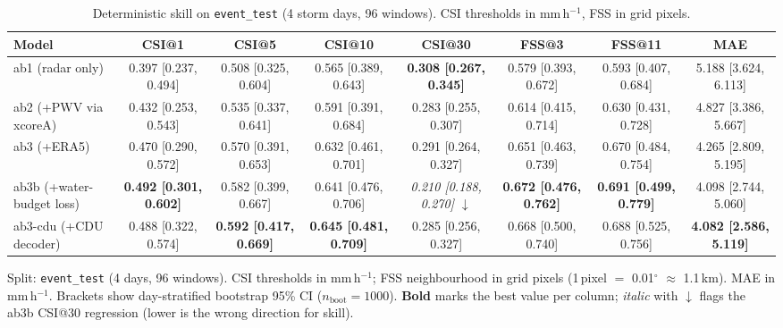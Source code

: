 
\begin{table}[t]
\centering
\small
\caption{Deterministic skill on \texttt{event\_test} (4 storm days, 96 windows). CSI thresholds in mm\,h$^{-1}$, FSS in grid pixels.}
\label{tab:event_test}
\begin{tabular}{lccccccc}
\toprule
Model & CSI@1 & CSI@5 & CSI@10 & CSI@30 & FSS@3 & FSS@11 & MAE \\
\midrule
ab1 (radar only) & 0.397 [0.237, 0.494] & 0.508 [0.325, 0.604] & 0.565 [0.389, 0.643] & \textbf{0.308 [0.267, 0.345]} & 0.579 [0.393, 0.672] & 0.593 [0.407, 0.684] & 5.188 [3.624, 6.113] \\
ab2 (+PWV via xcoreA) & 0.432 [0.253, 0.543] & 0.535 [0.337, 0.641] & 0.591 [0.391, 0.684] & 0.283 [0.255, 0.307] & 0.614 [0.415, 0.714] & 0.630 [0.431, 0.728] & 4.827 [3.386, 5.667] \\
ab3 (+ERA5) & 0.470 [0.290, 0.572] & 0.570 [0.391, 0.653] & 0.632 [0.461, 0.701] & 0.291 [0.264, 0.327] & 0.651 [0.463, 0.739] & 0.670 [0.484, 0.754] & 4.265 [2.809, 5.195] \\
ab3b (+water-budget loss) & \textbf{0.492 [0.301, 0.602]} & 0.582 [0.399, 0.667] & 0.641 [0.476, 0.706] & \textit{0.210 [0.188, 0.270] $\downarrow$} & \textbf{0.672 [0.476, 0.762]} & \textbf{0.691 [0.499, 0.779]} & 4.098 [2.744, 5.060] \\
ab3-cdu (+CDU decoder) & 0.488 [0.322, 0.574] & \textbf{0.592 [0.417, 0.669]} & \textbf{0.645 [0.481, 0.709]} & 0.285 [0.256, 0.327] & 0.668 [0.500, 0.740] & 0.688 [0.525, 0.756] & \textbf{4.082 [2.586, 5.119]} \\
\bottomrule
\end{tabular}
\par\medskip
\footnotesize Split: \texttt{event_test} (4 days, 96 windows). CSI thresholds in mm\,h$^{-1}$; FSS neighbourhood in grid pixels (1\,pixel $=$ 0.01$^\circ$ $\approx$ 1.1\,km). MAE in mm\,h$^{-1}$. Brackets show day-stratified bootstrap 95\% CI ($n_{\text{boot}} = 1000$). \textbf{Bold} marks the best value per column; \textit{italic} with $\downarrow$ flags the ab3b CSI@30 regression (lower is the wrong direction for skill).
\end{table}


